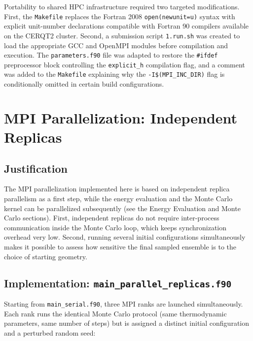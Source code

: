 \documentclass[11pt, a4paper]{article}
\begin{document}
Portability to shared HPC infrastructure required two targeted modifications.
First, the \texttt{Makefile} replaces the Fortran 2008 \texttt{open(newunit=u)}
syntax with explicit unit-number declarations compatible with Fortran 90
compilers available on the CERQT2 cluster. Second, a submission script
\texttt{1.run.sh} was created to load the appropriate GCC and OpenMPI modules
before compilation and execution. The \texttt{parameters.f90} file was adapted
to restore the \texttt{\#ifdef} preprocessor block controlling the
\texttt{explicit\_h} compilation flag, and a comment was added to the
\texttt{Makefile} explaining why the \texttt{-I\$(MPI\_INC\_DIR)} flag is
conditionally omitted in certain build configurations.

\section{MPI Parallelization: Independent Replicas}
\label{sec:parallel_replicas}

\subsection{Justification}

The MPI parallelization implemented here is based on independent replica parallelism as a first step, while the energy evaluation and the Monte Carlo kernel can be parallelized subsequently (see the Energy Evaluation and Monte Carlo sections). First, independent replicas do not require inter-process communication inside the Monte Carlo loop, which keeps synchronization overhead very low. Second, running several initial configurations simultaneously makes it possible to assess how sensitive the final sampled ensemble is to the choice of starting geometry.

\subsection{Implementation: \texttt{main\_parallel\_replicas.f90}}

Starting from \texttt{main\_serial.f90}, three MPI ranks are launched
simultaneously. Each rank runs the identical Monte Carlo protocol (same
thermodynamic parameters, same number of steps) but is assigned a distinct
initial configuration and a perturbed random seed:
\end{document}
